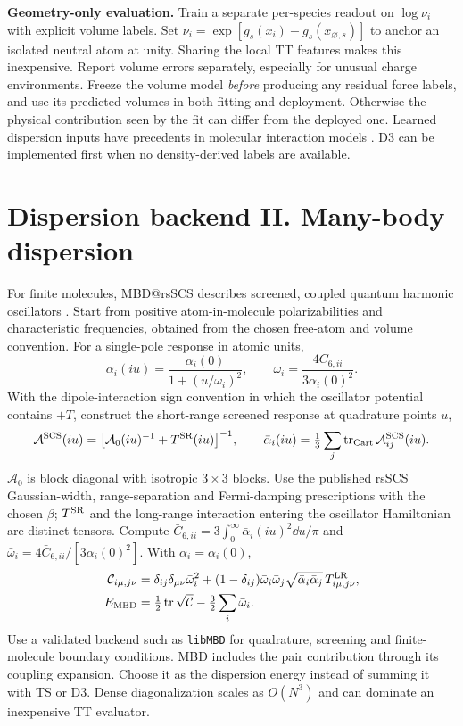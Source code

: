\documentclass[11pt,a4paper]{article}
\begin{document}
\textbf{Geometry-only evaluation.} Train a separate per-species readout on $\log\nu_i$ with explicit volume labels. Set $\nu_i=\exp[g_s(x_i)-g_s(x_{\varnothing,s})]$ to anchor an isolated neutral atom at unity. Sharing the local TT features makes this inexpensive. Report volume errors separately, especially for unusual charge environments. Freeze the volume model \emph{before} producing any residual force labels, and use its predicted volumes in both fitting and deployment. Otherwise the physical contribution seen by the fit can differ from the deployed one. Learned dispersion inputs have precedents in molecular interaction models \cite{ipml,mbdml}. D3 can be implemented first when no density-derived labels are available.

\pg\section{Dispersion backend II. Many-body dispersion}\label{sec:mbd}
For finite molecules, MBD@rsSCS describes screened, coupled quantum harmonic oscillators \cite{mbd,rsscs,libmbd}. Start from positive atom-in-molecule polarizabilities and characteristic frequencies, obtained from the chosen free-atom and volume convention. For a single-pole response in atomic units,
\[
 \alpha_i(iu)=\frac{\alpha_i(0)}{1+(u/\omega_i)^2},\qquad
 \omega_i=\frac{4C_{6,ii}}{3\alpha_i(0)^2}.
\]
With the dipole-interaction sign convention in which the oscillator potential contains $+T$, construct the short-range screened response at quadrature points $u$,
\[
 \mathcal A^{\rm SCS}(iu)=\big[\mathcal A_0(iu)^{-1}+T^{\rm SR}(iu)\big]^{-1},\qquad
 \bar\alpha_i(iu)=\tfrac13\sum_j\operatorname{tr}_{\rm Cart}\mathcal A^{\rm SCS}_{ij}(iu).
\]
$\mathcal A_0$ is block diagonal with isotropic $3\times3$ blocks. Use the published rsSCS Gaussian-width, range-separation and Fermi-damping prescriptions with the chosen $\beta$; $T^{\rm SR}$ and the long-range interaction entering the oscillator Hamiltonian are distinct tensors. Compute $\bar C_{6,ii}=3\int_0^\infty\bar\alpha_i(iu)^2\dd u/\pi$ and $\bar\omega_i=4\bar C_{6,ii}/[3\bar\alpha_i(0)^2]$. With $\bar\alpha_i=\bar\alpha_i(0)$,
\begin{align}
 \mathcal C_{i\mu,j\nu}
 &=\delta_{ij}\delta_{\mu\nu}\bar\omega_i^2+
 (1-\delta_{ij})\bar\omega_i\bar\omega_j
 \sqrt{\bar\alpha_i\bar\alpha_j}\,T^{\rm LR}_{i\mu,j\nu},\nonumber\\
 E_{\rm MBD}&=\tfrac12\operatorname{tr}\sqrt{\mathcal C}-\tfrac32\sum_i\bar\omega_i .
 \label{eq:mbd}
\end{align}
Use a validated backend such as \texttt{libMBD} for quadrature, screening and finite-molecule boundary conditions. MBD includes the pair contribution through its coupling expansion. Choose it as the dispersion energy instead of summing it with TS or D3. Dense diagonalization scales as $O(N^3)$ and can dominate an inexpensive TT evaluator.
\end{document}
